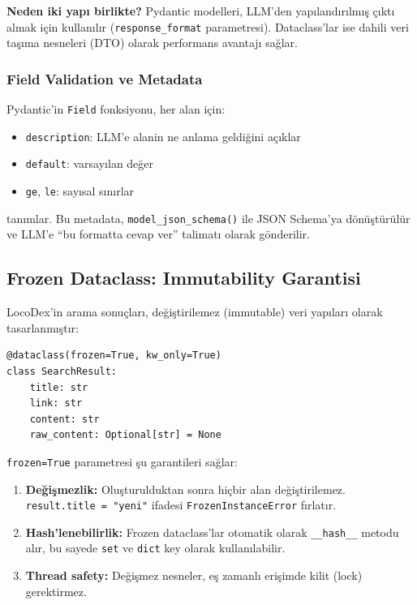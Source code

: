 \textbf{Neden iki yap{\i} birlikte?} Pydantic modelleri, LLM'den yap{\i}land{\i}r{\i}lm{\i}\c{s} \c{c}{\i}kt{\i} almak i\c{c}in kullan{\i}l{\i}r (\texttt{response\_format} parametresi). Dataclass'lar ise dahili veri ta\c{s}{\i}ma nesneleri (DTO) olarak performans avantaj{\i} sa\u{g}lar.

\subsubsection{Field Validation ve Metadata}

Pydantic'in \texttt{Field} fonksiyonu, her alan i\c{c}in:
\begin{itemize}
  \item \texttt{description}: LLM'e alanin ne anlama geldi\u{g}ini a\c{c}{\i}klar
  \item \texttt{default}: varsay{\i}lan de\u{g}er
  \item \texttt{ge}, \texttt{le}: say{\i}sal s{\i}n{\i}rlar
\end{itemize}
tan{\i}mlar. Bu metadata, \texttt{model\_json\_schema()} ile JSON Schema'ya d\"{o}n\"{u}\c{s}t\"{u}r\"{u}l\"{u}r ve LLM'e ``bu formatta cevap ver'' talimat{\i} olarak g\"{o}nderilir.

\subsection{Frozen Dataclass: Immutability Garantisi}
\label{subsec:frozen-dataclass}

LocoDex'in arama sonu\c{c}lar{\i}, de\u{g}i\c{s}tirilemez (immutable) veri yap{\i}lar{\i} olarak tasarlanm{\i}\c{s}t{\i}r:

\begin{verbatim}
@dataclass(frozen=True, kw_only=True)
class SearchResult:
    title: str
    link: str
    content: str
    raw_content: Optional[str] = None
\end{verbatim}

\texttt{frozen=True} parametresi \c{s}u garantileri sa\u{g}lar:

\begin{enumerate}
  \item \textbf{De\u{g}i\c{s}mezlik:} Olu\c{s}turulduktan sonra hi\c{c}bir alan de\u{g}i\c{s}tirilemez. \texttt{result.title = "yeni"} ifadesi \texttt{FrozenInstanceError} f{\i}rlat{\i}r.
  \item \textbf{Hash'lenebilirlik:} Frozen dataclass'lar otomatik olarak \texttt{\_\_hash\_\_} metodu al{\i}r, bu sayede \texttt{set} ve \texttt{dict} key olarak kullan{\i}labilir.
  \item \textbf{Thread safety:} De\u{g}i\c{s}mez nesneler, e\c{s} zamanl{\i} eri\c{s}imde kilit (lock) gerektirmez.
\end{enumerate}

